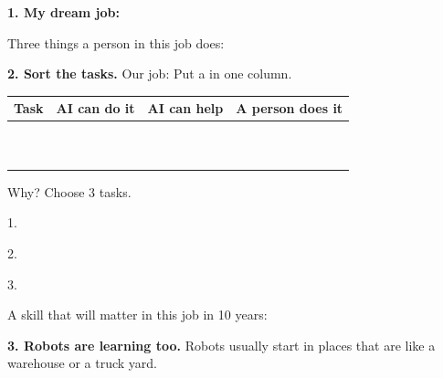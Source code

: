 \documentclass[11pt]{article}
\begin{document}
\partner

\vspace{0.4em}
{\large\textbf{1. My dream job:}} 

\vspace{0.6em}
Three things a person in this job does: 

\vspace{1.0em}
{\large\textbf{2. Sort the tasks.}} Our job:  Put a  in one column.

\vspace{0.3em}
\begin{tabular}{|R{3.1in}|c|c|c|}
\hline
\textbf{Task} & \textbf{AI can do it} & \textbf{AI can help} & \textbf{A person does it} \\ \hline
{} &  & & \\ \hline
{} & & &  \\ \hline
 & & & \\ \hline
 & & & \\ \hline
 & & & \\ \hline
 & & & \\ \hline
 & & & \\ \hline
 & & & \\ \hline
 & & & \\ \hline
 & & & \\ \hline
\end{tabular}

\vspace{0.7em}
Why? Choose 3 tasks.

\vspace{0.5em}
1. 

\vspace{0.4em}
2. \blank{6.6in}

\vspace{0.4em}
3. \blank{6.6in}

\vspace{0.7em}
A skill that will matter in this job in 10 years: 

\vspace{0.8em}
{\large\textbf{3. Robots are learning too.}} Robots usually start in places that are  like a warehouse or a truck yard.
\end{document}
